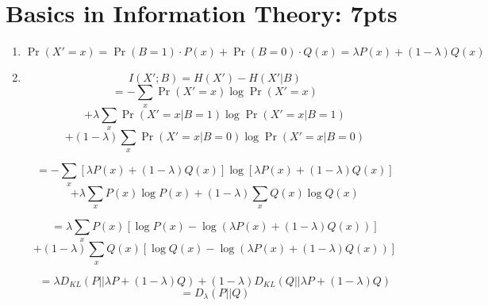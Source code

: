 \documentclass[12pt]{article}
\begin{document}
\section{Basics in Information Theory: 7pts}
\begin{enumerate}
    \item \[\Pr(X'=x) = \Pr(B=1)\cdot P(x) + \Pr(B=0)\cdot Q(x) = \lambda P(x) + (1-\lambda) Q(x)\]
    \item \[I(X';B) = H(X') - H(X'|B)\]
    \[= -\sum_x \Pr(X'=x)\log\Pr(X'=x)\] 
    \[+\lambda\sum_{x}\Pr(X'=x|B=1)\log\Pr(X'=x|B=1)\]
    \[+(1-\lambda)\sum_{x}\Pr(X'=x|B=0)\log\Pr(X'=x|B=0)\]

    \[= -\sum_x\left[\lambda P(x) + (1-\lambda) Q(x)\right]\log\left[\lambda P(x) + (1-\lambda) Q(x)\right]\]
    \[+\lambda\sum_{x}P(x)\log P(x) + (1-\lambda)\sum_{x}Q(x)\log Q(x)\]

    \[= \lambda\sum_{x} P(x)\left[\log P(x) - \log(\lambda P(x) + (1-\lambda) Q(x))\right]\]
    \[+ (1-\lambda)\sum_{x} Q(x)\left[\log Q(x) - \log(\lambda P(x) + (1-\lambda) Q(x))\right]\]

    \[= \lambda D_{KL}(P||\lambda P + (1-\lambda)Q) + (1-\lambda)D_{KL}(Q||\lambda P + (1-\lambda)Q)\]
    \[= D_\lambda(P||Q)\]
\end{enumerate}
\newpage
\end{document}
